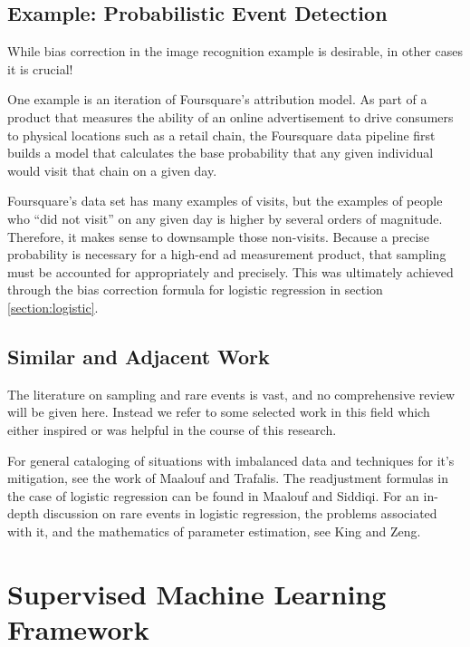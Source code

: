 \documentclass[twoside]{article}
\begin{document}
\subsection{Example: Probabilistic Event Detection}
\label{section:visit}

While bias correction in the image recognition example is desirable, in other cases it is crucial!

One example is an iteration of Foursquare’s attribution model\cite{visitprediction}. As part of a product that measures the ability of an online advertisement to drive consumers to physical locations such as a retail chain, the Foursquare data pipeline first builds a model that calculates the base probability that any given individual would visit that chain on a given day.

Foursquare's data set has many examples of visits, but the examples of people who “did not visit” on any given day is higher by several orders of magnitude. Therefore, it makes sense to downsample those non-visits. Because a precise probability is necessary for a high-end ad measurement product, that sampling must be accounted for appropriately and precisely. This was ultimately achieved through the bias correction formula for logistic regression in section \ref{section:logistic}.

\subsection{Similar and Adjacent Work}

The literature on sampling and rare events is vast, and no comprehensive review will be given here. Instead we refer to some selected work in this field which either inspired or was helpful in the course of this research.

For general cataloging of situations with imbalanced data and techniques for it's mitigation, see the work of Maalouf and Trafalis\cite{rareevents}. The readjustment formulas in the case of logistic regression can be found in Maalouf and Siddiqi\cite{weightedlogistic}. For an in-depth discussion on rare events in logistic regression, the problems associated with it, and the mathematics of parameter estimation, see King and Zeng\cite{king}.

\section{Supervised Machine Learning Framework} \label{framework}
\end{document}
